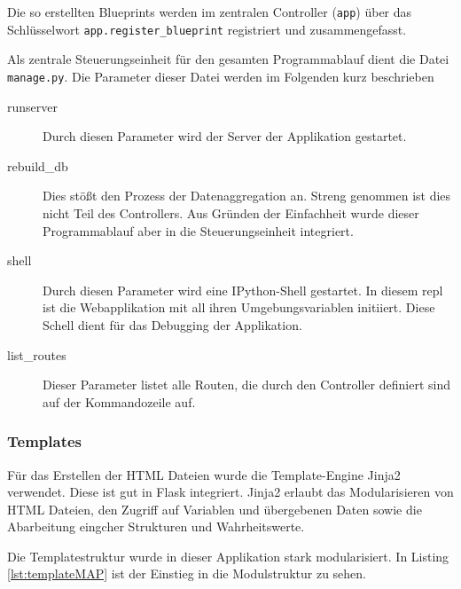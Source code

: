 Die so erstellten Blueprints werden im zentralen Controller (\texttt{app}) über das Schlüsselwort \texttt{app.register\_blueprint} registriert und zusammengefasst. 


Als zentrale Steuerungseinheit für den gesamten Programmablauf dient die Datei \texttt{manage.py}. Die Parameter dieser Datei werden im Folgenden kurz beschrieben

\begin{description}

 \item [runserver] Durch diesen Parameter wird der Server der Applikation gestartet.


 \item [rebuild\_db] Dies stößt den Prozess der Datenaggregation an.  Streng genommen ist dies nicht Teil des Controllers. Aus Gründen der Einfachheit wurde dieser Programmablauf aber in die Steuerungseinheit integriert.
 
 \item [shell] Durch diesen Parameter wird eine IPython-Shell gestartet. In diesem repl ist die Webapplikation mit all ihren Umgebungsvariablen initiiert. Diese Schell dient für das Debugging der Applikation. 
 
 \item [list\_routes] Dieser Parameter listet alle Routen, die durch den Controller definiert sind auf der Kommandozeile auf.
\end{description}


\subsubsection{Templates}

Für das Erstellen der HTML Dateien wurde die Template-Engine Jinja2 verwendet. Diese ist gut in Flask integriert. Jinja2 erlaubt das Modularisieren von HTML Dateien, den Zugriff auf Variablen und übergebenen Daten sowie die Abarbeitung eingcher Strukturen und Wahrheitswerte. 


Die Templatestruktur wurde in dieser Applikation stark modularisiert.  In Listing \ref{lst:templateMAP} ist der Einstieg in die Modulstruktur zu sehen.

